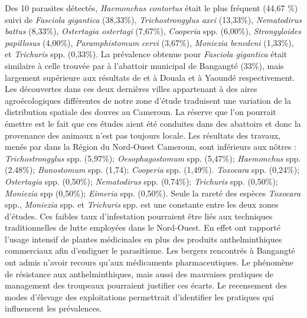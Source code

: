 Des 10 parasites détectés, \textit{Haemonchus contortus} était le plus fréquent (44,67 \%) suivi de \textit{Fasciola gigantica} (38,33\%), \textit{Trichostrongylus axei} (13,33\%), \textit{Nematodirus battus} (8,33\%), \textit{Ostertagia ostertagi} (7,67\%), \textit{Cooperia} spp. (6,00\%), \textit{Strongyloides papillosus} (4,00\%), \textit{Paramphistomum cervi} (3,67\%), \textit{Moniezia benedeni} (1,33\%), et \textit{Trichuris} spp. (0,33\%). La prévalence obtenue pour \textit{Fasciola gigantica} était similaire à celle trouvée par  à l’abattoir municipal de Bangangté (33\%), mais largement supérieure aux résultats de  et  à Douala et à Yaoundé respectivement. Les découvertes dans ces deux dernières villes appartenant à des aires agroécologiques différentes de notre zone d’étude traduisent une variation de la distribution spatiale des douves au Cameroun. La réserve que l’on pourrait émettre est le fait que ces études aient été conduites dans des abattoirs et donc la provenance des animaux n’est pas toujours locale. Les résultats des travaux, menés par  dans la Région du Nord-Ouest Cameroun, sont inférieurs aux nôtres : \textit{Trichostrongylus} spp. (5,97\%); \textit{Oesophagostomum} spp. (5,47\%); \textit{Haemonchus} spp. (2.48\%); \textit{Bunostomum} spp. (1,74); \textit{Cooperia} spp. (1,49\%). \textit{Toxocara} spp. (0,24\%); \textit{Ostertagia} spp. (0,50\%); \textit{Nematodirus} spp. (0,74\%); \textit{Trichuris} spp. (0,50\%); \textit{Moniezia} spp (0,50\%); \textit{Eimeria} spp. (0,50\%). Seule la rareté des espèces \textit{Toxocara} spp., \textit{Moniezia} spp. et \textit{Trichuris} spp. est une constante entre les deux zones d’études. Ces faibles taux d’infestation pourraient être liés aux techniques traditionnelles de lutte employées dans le Nord-Ouest. En effet  ont rapporté l’usage intensif de plantes médicinales en plus des produits anthelminthiques commerciaux afin d’endiguer le parasitisme. Les bergers rencontrés à Bangangté ont admis n’avoir recours qu’aux médicaments pharmaceutiques. Le phénomène de résistance aux anthelminthiques, mais aussi des mauvaises pratiques de management des troupeaux pourraient justifier ces écarts. Le recensement des modes d'élevage des exploitations permettrait d’identifier les pratiques qui influencent les prévalences.

